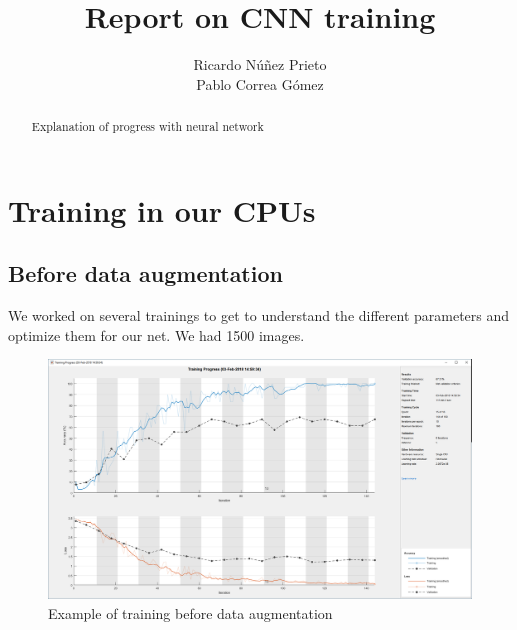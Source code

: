 \documentclass[]{article}
\title{Report on CNN training}
\author{Ricardo Núñez Prieto \\
		Pablo Correa Gómez}
\begin{document}
\maketitle


\begin{abstract}
	Explanation of progress with neural network

\end{abstract}



\section{Training in our CPUs}
\subsection{Before data augmentation}
We worked on several trainings to get to understand the different parameters and optimize them for our net.
\newline
We had 1500 images.
	\begin{figure}[h]
		\centering
		\includegraphics[width=1\textwidth]{cpu_bef_aug.png}
		\caption{Example of training before data augmentation}
	\end{figure}

\newpage
\end{document}
